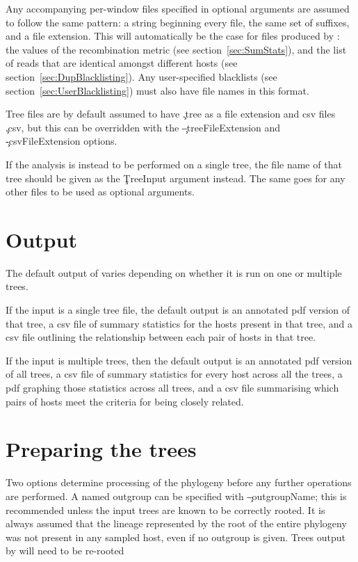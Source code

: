 Any accompanying per-window files specified in optional arguments are assumed to follow the same pattern: a string beginning every file, the same set of suffixes, and a file extension.
This will automatically be the case for files produced by \pmt: the values of the recombination metric (see section~\ref{sec:SumStats}), and the list of reads that are identical amongst different hosts (see section~\ref{sec:DupBlacklisting}).
Any user-specified blacklists (see section~\ref{sec:UserBlacklisting}) must also have file names in this format.

Tree files are by default assumed to have \c{.tree} as a file extension and csv files \c{.csv}, but this can be overridden with the \c{--treeFileExtension} and \c{-csvFileExtension} options.

If the analysis is instead to be performed on a single tree, the file name of that tree should be given as the \c{TreeInput} argument instead.
The same goes for any other files to be used as optional arguments.

\section{Output}

The default output of \pat varies depending on whether it is run on one or multiple trees.

If the input is a single tree file, the default output is an annotated pdf version of that tree, a csv file of summary statistics for the hosts present in that tree, and a csv file outlining the relationship between each pair of hosts in that tree.

If the input is multiple trees, then the default output is an annotated pdf version of all trees, a csv file of summary statistics for every host across all the trees, a pdf graphing those statistics across all trees, and a csv file summarising which pairs of hosts meet the criteria for being closely related.

\section{Preparing the trees}

Two options determine processing of the phylogeny before any further operations are performed.
A named outgroup can be specified with \c{--outgroupName}; this is recommended unless the input trees are known to be correctly rooted.
It is always assumed that the lineage represented by the root of the entire phylogeny was not present in any sampled host, even if no outgroup is given.
Trees output by \pmt will need to be re-rooted

